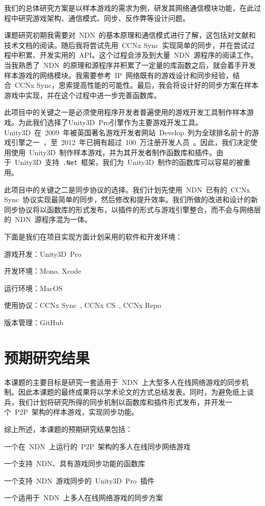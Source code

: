 我们的总体研究方案是以样本游戏的需求为例，研发其网络通信模块功能，在此过程中研究游戏架构、通信模式、同步、反作弊等设计问题。

课题研究初期我需要对~NDN~的基本原理和通信模式进行了解，这包括对文献和技术文档的阅读。随后我将尝试先用~CCNx Sync~实现简单的同步，并在尝试过程中积累、开发实用的~API。这个过程会涉及到大量~NDN~源程序的阅读工作。当我熟悉了~NDN~的原理和源程序并积累了一定量的库函数之后，就会着手开发样本游戏的网络模块。我需要参考~IP~网络既有的游戏设计和同步经验，结合~CCNx Sync，思索提高性能的可能性。最后，我会将设计好的同步方案在样本游戏中实现，并在这个过程中进一步完善函数库。

此项目中的关键之一是必须使用程序开发者普遍使用的游戏开发工具制作样本游戏。为此我们选择了Unity3D\tm~Pro引擎作为主要游戏开发工具。Unity3D\tm~在~2009~年被英国著名游戏开发者网站~Develop~列为全球排名前十的游戏引擎之一~\cite{unityrank}，至~2012~年已拥有超过~100~万注册开发人员~\cite{unityppl}。因此，我们决定使用使用~Unity3D\tm~制作样本游戏，并为其开发者制作函数库和插件。由于~Unity3D\tm~支持~\verb|.Net|~框架，我们为~Unity3D\tm~制作的函数库可以容易的被重用。

此项目中的关键之二是同步协议的选择。我们计划先使用~NDN~已有的~CCNx Sync~协议实现最简单的同步，然后修改和提升效率。我们所做的改进和设计的新同步协议将以函数库的形式发布，以插件的形式与游戏引擎整合，而不会与网络层的~NDN~源程序混为一体。

下面是我们在项目实现方面计划采用的软件和开发环境：
\begin{itemize*}
\item 游戏开发：Unity3D\tm~Pro
\item 开发环境：Mono\tm, Xcode\tm
\item 运行环境：MacOS\tm
\item 使用协议：CCNx Sync~\cite{CCNxSync}, CCNx CS~\cite{CCNxCS}, CCNx Repo~\cite{CCNxRepo}
\item 版本管理：GitHub\tm
\end{itemize*}


\section{预期研究结果}
本课题的主要目标是研究一套适用于~NDN~上大型多人在线网络游戏的同步机制。因此本课题的最终成果将以学术论文的方式总结发表。同时，为避免纸上谈兵，我们计划将研究所得的同步机制以函数库和插件形式发布，并开发一个~P2P~架构的样本游戏，实现同步功能。

综上所述，本课题的预期研究结果包括：
\begin{itemize*}
\item 一个在~NDN~上运行的~P2P~架构的多人在线同步网络游戏
\item 一个支持~NDN、具有游戏同步功能的函数库
\item 一个支持~NDN~游戏同步的~Unity3D\tm~Pro~插件
\item 一个适用于~NDN~上多人在线网络游戏的同步方案
\end{itemize*}








